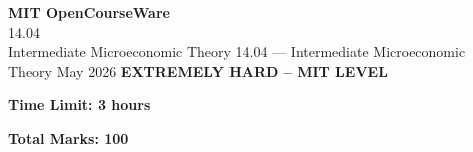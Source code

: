 \documentclass[12pt,a4paper]{exam}
\begin{document}
\begin{center}
{\LARGE \textbf{MIT OpenCourseWare}}\\14.04\\Intermediate Microeconomic Theory
\vspace{0.5cm}
{14.04} --- {Intermediate Microeconomic Theory}
\vspace{0.3cm}
May 2026
\vspace{0.3cm}
\textbf{EXTREMELY HARD -- MIT LEVEL}
\end{center}

\begin{center}
\textbf{Time Limit: 3 hours}
\end{center}

\begin{center}
\textbf{Total Marks: 100}
\end{center}

\vspace{0.5cm}
\end{document}
